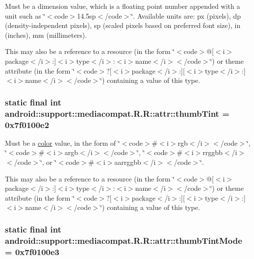 Must be a dimension value, which is a floating point number appended with a unit such as \char`\"{}$<$code$>$14.5sp$<$/code$>$\char`\"{}. Available units are: px (pixels), dp (density-independent pixels), sp (scaled pixels based on preferred font size), in (inches), mm (millimeters). 

This may also be a reference to a resource (in the form \char`\"{}$<$code$>$@\mbox{[}$<$i$>$package$<$/i$>$:\mbox{]}$<$i$>$type$<$/i$>$:$<$i$>$name$<$/i$>$$<$/code$>$\char`\"{}) or theme attribute (in the form \char`\"{}$<$code$>$?\mbox{[}$<$i$>$package$<$/i$>$:\mbox{]}\mbox{[}$<$i$>$type$<$/i$>$:\mbox{]}$<$i$>$name$<$/i$>$$<$/code$>$\char`\"{}) containing a value of this type. \hypertarget{classandroid_1_1support_1_1mediacompat_1_1_r_1_1attr_8512a21f46d1a0d509d4be17ebe92dd1}{
\subsubsection[{thumbTint}]{\setlength{\rightskip}{0pt plus 5cm}static final int android::support::mediacompat.R.R::attr::thumbTint = 0x7f0100e2}}
\label{classandroid_1_1support_1_1mediacompat_1_1_r_1_1attr_8512a21f46d1a0d509d4be17ebe92dd1}


Must be a \hyperlink{classandroid_1_1support_1_1mediacompat_1_1_r_1_1color}{color} value, in the form of \char`\"{}$<$code$>$\#$<$i$>$rgb$<$/i$>$$<$/code$>$\char`\"{}, \char`\"{}$<$code$>$\#$<$i$>$argb$<$/i$>$$<$/code$>$\char`\"{}, \char`\"{}$<$code$>$\#$<$i$>$rrggbb$<$/i$>$$<$/code$>$\char`\"{}, or \char`\"{}$<$code$>$\#$<$i$>$aarrggbb$<$/i$>$$<$/code$>$\char`\"{}. 

This may also be a reference to a resource (in the form \char`\"{}$<$code$>$@\mbox{[}$<$i$>$package$<$/i$>$:\mbox{]}$<$i$>$type$<$/i$>$:$<$i$>$name$<$/i$>$$<$/code$>$\char`\"{}) or theme attribute (in the form \char`\"{}$<$code$>$?\mbox{[}$<$i$>$package$<$/i$>$:\mbox{]}\mbox{[}$<$i$>$type$<$/i$>$:\mbox{]}$<$i$>$name$<$/i$>$$<$/code$>$\char`\"{}) containing a value of this type. \hypertarget{classandroid_1_1support_1_1mediacompat_1_1_r_1_1attr_1b5ef84f36055ec985cd8b1003ab89bd}{
\subsubsection[{thumbTintMode}]{\setlength{\rightskip}{0pt plus 5cm}static final int android::support::mediacompat.R.R::attr::thumbTintMode = 0x7f0100e3}}
\label{classandroid_1_1support_1_1mediacompat_1_1_r_1_1attr_1b5ef84f36055ec985cd8b1003ab89bd}


